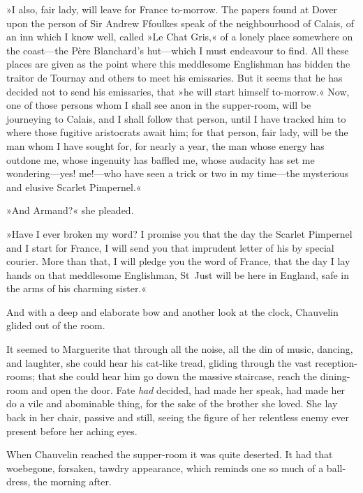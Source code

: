 »I also, fair lady, will leave for France to-morrow. The papers found at Dover upon the person of Sir Andrew Ffoulkes speak of the neighbourhood of Calais, of an inn which I know well, called »Le Chat Gris,« of a lonely place somewhere on the coast\allowbreak---\allowbreak the Père Blanchard's hut\allowbreak---\allowbreak which I must endeavour to find. All these places are given as the point where this meddlesome Englishman has bidden the traitor de Tournay and others to meet his emissaries. But it seems that he has decided not to send his emissaries, that »he will start himself to-morrow.« Now, one of those persons whom I shall see anon in the supper-room, will be journeying to Calais, and I shall follow that person, until I have tracked him to where those fugitive aristocrats await him; for that person, fair lady, will be the man whom I have sought for, for nearly a year, the man whose energy has outdone me, whose ingenuity has baffled me, whose audacity has set me wondering\allowbreak---\allowbreak yes! me!\allowbreak---\allowbreak who have seen a trick or two in my time\allowbreak---\allowbreak the mysterious and elusive Scarlet Pimpernel.«

»And Armand?« she pleaded.

»Have I ever broken my word? I promise you that the day the Scarlet Pimpernel and I start for France, I will send you that imprudent letter of his by special courier. More than that, I will pledge you the word of France, that the day I lay hands on that meddlesome Englishman, St~Just will be here in England, safe in the arms of his charming sister.«

And with a deep and elaborate bow and another look at the clock, Chauvelin glided out of the room.

It seemed to Marguerite that through all the noise, all the din of music, dancing, and laughter, she could hear his cat-like tread, gliding through the vast reception-rooms; that she could hear him go down the massive staircase, reach the dining-room and open the door. Fate \textit{had} decided, had made her speak, had made her do a vile and abominable thing, for the sake of the brother she loved. She lay back in her chair, passive and still, seeing the figure of her relentless enemy ever present before her aching eyes.

When Chauvelin reached the supper-room it was quite deserted. It had that woebegone, forsaken, tawdry appearance, which reminds one so much of a ball-dress, the morning after.


